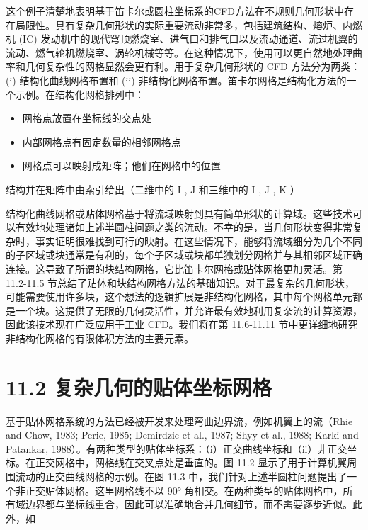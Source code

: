 \documentclass[11pt,a4paper,openany,fontset=none]{ctexbook}
\begin{document}
这个例子清楚地表明基于笛卡尔或圆柱坐标系的CFD方法在不规则几何形状中存在局限性。具有复杂几何形状的实际重要流动非常多，包括建筑结构、熔炉、内燃机 (IC) 发动机中的现代穹顶燃烧室、进气口和排气口以及流动通道、流过机翼的流动、燃气轮机燃烧室、涡轮机械等等。在这种情况下，使用可以更自然地处理曲率和几何复杂性的网格显然会更有利。用于复杂几何形状的 CFD 方法分为两类：(i) 结构化曲线网格布置和 (ii) 非结构化网格布置。笛卡尔网格是结构化方法的一个示例。在结构化网格排列中：

\begin{itemize}

\item 网格点放置在坐标线的交点处

\item 内部网格点有固定数量的相邻网格点

\item 网格点可以映射成矩阵；他们在网格中的位置

\end{itemize}

结构并在矩阵中由索引给出（二维中的 I , J 和三维中的 I , J , K ）

结构化曲线网格或贴体网格基于将流域映射到具有简单形状的计算域。这些技术可以有效地处理诸如上述半圆柱问题之类的流动。不幸的是，当几何形状变得非常复杂时，事实证明很难找到可行的映射。在这些情况下，能够将流域细分为几个不同的子区域或块通常是有利的，每个子区域或块都单独划分网格并与其相邻区域正确连接。这导致了所谓的块结构网格，它比笛卡尔网格或贴体网格更加灵活。第 11.2-11.5 节总结了贴体和块结构网格方法的基础知识。对于最复杂的几何形状，可能需要使用许多块，这个想法的逻辑扩展是非结构化网格，其中每个网格单元都是一个块。这提供了无限的几何灵活性，并允许最有效地利用复杂流的计算资源，因此该技术现在广泛应用于工业 CFD。我们将在第 11.6-11.11 节中更详细地研究非结构化网格的有限体积方法的主要元素。

\section*{11.2 复杂几何的贴体坐标网格}

基于贴体网格系统的方法已经被开发来处理弯曲边界流，例如机翼上的流（Rhie and Chow, 1983; Peric, 1985; Demirdzic et al., 1987; Shyy et al., 1988; Karki and Patankar, 1988）。有两种类型的贴体坐标系：（i）正交曲线坐标和（ii）非正交坐标。在正交网格中，网格线在交叉点处是垂直的。图 11.2 显示了用于计算机翼周围流动的正交曲线网格的示例。在图 11.3 中，我们针对上述半圆柱问题提出了一个非正交贴体网格。这里网格线不以 90° 角相交。在两种类型的贴体网格中，所有域边界都与坐标线重合，因此可以准确地合并几何细节，而不需要逐步近似。此外，如
\end{document}
